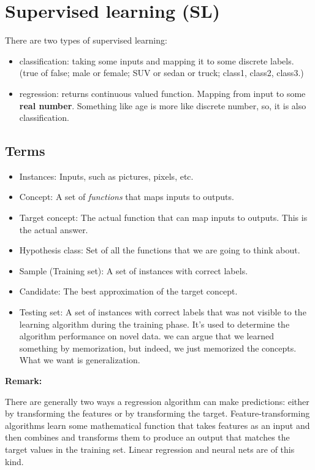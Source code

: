 \documentclass[12pt]{report}
\begin{document}
\chapter[Supervised learning]{Supervised learning (SL)}
\label{ch:sl}
There are two types of supervised learning:

\begin{itemize}
\item classification: taking some inputs and mapping it to some discrete labels. (true of false; male or female; SUV or sedan or truck; class1, class2, class3.)
\item regression: returns continuous valued function. Mapping from input to some \textbf{real number}. Something like age is more like discrete number, so, it is also classification.
\end{itemize}

\section{Terms}
\begin{itemize}
\item Instances: Inputs, such as pictures, pixels, etc.
\item Concept: A set of \textit{functions} that maps inputs to outputs.
\item Target concept: The actual function that can map inputs to outputs. This is the actual answer.
\item Hypothesis class: Set of all the functions that we are going to think about.
\item Sample (Training set): A set of instances with correct labels.
\item Candidate: The best approximation of the target concept.
\item Testing set: A set of instances with correct labels that was not visible to the learning algorithm during the training phase. It’s used to determine the algorithm performance on novel data. we can argue that we learned something by memorization, but indeed, we just memorized the concepts. What we want is generalization.
\end{itemize}

\textbf{Remark:}

There are generally two ways a regression algorithm can make predictions: either by transforming the features or by transforming the target. Feature-transforming algorithms learn some mathematical function that takes features as an input and then combines and transforms them to produce an output that matches the target values in the training set. Linear regression and neural nets are of this kind.
\end{document}
